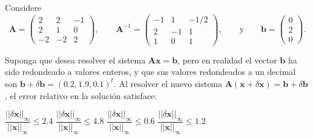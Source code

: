 \begin{pregunta}
\begin{cuerpo}
Considere
$$
\boldsymbol{A}=\left(
\begin{array}{rrr}
  2 & 2 & -1 \\
  2 & 1 & 0 \\
  -2 & -2 & 2
\end{array}
\right),\qquad \boldsymbol{A}^{-1}=\left(
\begin{array}{rrr}
  -1 & 1 & -1/2 \\
  2 & -1 & 1 \\
  1 & 0 & 1
\end{array}
\right), \qquad \textrm{y}\qquad \boldsymbol{b}=\left(
\begin{array}{r}
  0 \\
  2 \\
  0
\end{array}
\right).
$$

Suponga que desea resolver el sistema $\boldsymbol{Ax}=\boldsymbol{b}$, pero en realidad el vector $\boldsymbol{b}$ ha sido redondeado a valores enteros, y que sus valores redondeados a un decimal son \break  $\boldsymbol{b}+\delta\boldsymbol{b}=(0{.}2,1{.}9,0{.}1)^t$. Al resolver el nuevo sistema $\boldsymbol{A}(\boldsymbol{x}+\delta\boldsymbol{x})=\boldsymbol{b}+\delta\boldsymbol{b}$, el error relativo en la soluci\'on satisface:
\end{cuerpo}
\begin{multicols}{2}
\begin{alternativas}
{$\dfrac{||\delta\boldsymbol{x}||_\infty}{||\boldsymbol{x}||_\infty}\leq 2{.}4$}
{$\dfrac{||\delta\boldsymbol{x}||_\infty}{||\boldsymbol{x}||_\infty}\leq 4{.}8$}
{$\dfrac{||\delta\boldsymbol{x}||_\infty}{||\boldsymbol{x}||_\infty}\leq 0{.}6$}
{$\dfrac{||\delta\boldsymbol{x}||_\infty}{||\boldsymbol{x}||_\infty}\leq 1{.}2$}
\end{alternativas}
\end{multicols}
\justificacion{7cm}
\end{pregunta}